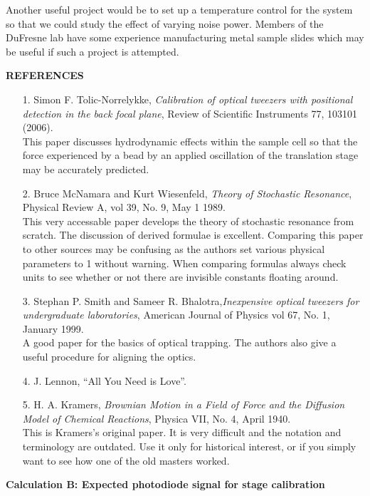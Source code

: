 \documentclass{report}
\begin{document}
Another useful project would be to set up a temperature control for the system so that we could study the effect of varying noise power. Members of the DuFresne lab have some experience manufacturing metal sample slides which may be useful if such a project is attempted.


\newpage
\begin{center}
{\bf REFERENCES}
\end{center}

\begin{itemize}
\item[1.] Simon F. Tolic-Norrelykke, \textit{Calibration of optical tweezers with positional detection in the back focal plane}, Review of Scientific Instruments 77, 103101 (2006).\\This paper discusses hydrodynamic effects within the sample cell so that the force experienced by a bead by an applied oscillation of the translation stage may be accurately predicted.
\item[2.] Bruce McNamara and Kurt Wiesenfeld, \textit{Theory of Stochastic Resonance}, Physical Review A, vol 39, No. 9, May 1 1989.\\This very accessable paper develops the theory of stochastic resonance from scratch. The discussion of derived formulae is excellent. Comparing this paper to other sources may be confusing as the authors set various physical parameters to 1 without warning. When comparing formulas always check units to see whether or not there are invisible constants floating around.
\item[3.] Stephan P. Smith and Sameer R. Bhalotra,\textit{Inexpensive optical tweezers for undergraduate laboratories}, American Journal of Physics vol 67, No. 1, January 1999.\\A good paper for the basics of optical trapping. The authors also give a useful procedure for aligning the optics.
\item[4.] J. Lennon, ``All You Need is Love''.
\item[5.] H. A. Kramers, \textit{Brownian Motion in a Field of Force and the Diffusion Model of Chemical Reactions}, Physica VII, No. 4, April 1940.\\This is Kramers's original paper. It is very difficult and the notation and terminology are outdated. Use it only for historical interest, or if you simply want to see how one of the old masters worked.
\end{itemize}

\newpage
\begin{center}
{\bf Calculation B: Expected photodiode signal for stage calibration}
\end{center}
\end{document}
